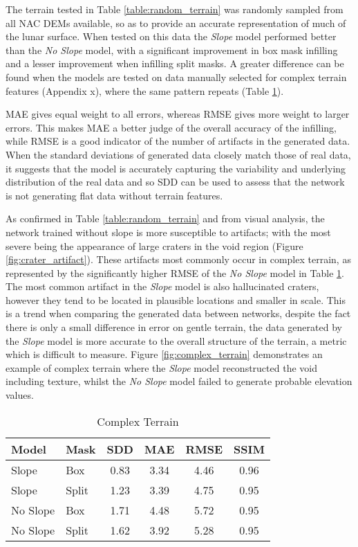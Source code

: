 \documentclass[twocolumn]{article}
\begin{document}
The terrain tested in Table \ref{table:random_terrain} was randomly sampled from all NAC DEMs available, so as to provide an accurate representation of much of the lunar surface.
When tested on this data the \emph{Slope} model performed better than the \emph{No Slope} model, with a significant improvement in box mask infilling and a lesser improvement when infilling split masks.
A greater difference can be found when the models are tested on data manually selected for complex terrain features (Appendix x),  where the same pattern repeats (Table \ref{table:complex_terrain}).

MAE gives equal weight to all errors, whereas RMSE gives more weight to larger errors.
This makes MAE a better judge of the overall accuracy of the infilling, while RMSE is a good indicator of the number of artifacts in the generated data.
When the standard deviations of generated data closely match those of real data, it suggests that the model is accurately capturing the variability and underlying distribution of the real data and so SDD can be used to assess that the network is not generating flat data without terrain features.

As confirmed in Table \ref{table:random_terrain} and from visual analysis, the network trained without slope is more susceptible to artifacts; with the most severe being the appearance of large craters in the void region (Figure \ref{fig:crater_artifact}).
These artifacts most commonly occur in complex terrain, as represented by the significantly higher RMSE of the \emph{No Slope} model in Table \ref{table:complex_terrain}.
The most common artifact in the \emph{Slope} model is also hallucinated craters, however they tend to be located in plausible locations and smaller in scale.
This is a trend when comparing the generated data between networks, despite the fact there is only a small difference in error on gentle terrain, the data generated by the \emph{Slope} model is more accurate to the overall structure of the terrain, a metric which is difficult to measure.
Figure \ref{fig:complex_terrain} demonstrates an example of complex terrain where the \emph{Slope} model reconstructed the void including texture, whilst the \emph{No Slope} model failed to generate probable elevation values.

\begin{table}[htbp]
\caption{\label{table:complex_terrain}Complex Terrain}
\centering
\begin{tabular}{llcccc}
Model & Mask & SDD & MAE & RMSE & SSIM\\[0pt]
\hline
Slope & Box & 0.83 & 3.34 & 4.46 & 0.96\\[0pt]
Slope & Split & 1.23 & 3.39 & 4.75 & 0.95\\[0pt]
No Slope & Box & 1.71 & 4.48 & 5.72 & 0.95\\[0pt]
No Slope & Split & 1.62 & 3.92 & 5.28 & 0.95\\[0pt]
\end{tabular}
\end{table}
\end{document}

